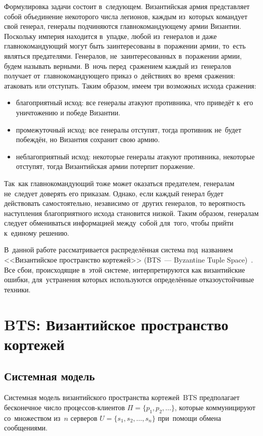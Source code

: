Формулировка задачи состоит в~следующем. Византийская армия представляет собой объединение некоторого числа легионов, каждым из~которых командует свой генерал, генералы подчиняются главнокомандующему армии Византии. Поскольку империя находится в~упадке, любой из~генералов и даже главнокомандующий могут быть заинтересованы в~поражении армии, то~есть являться предателями. Генералов, не~заинтересованных в~поражении армии, будем называть верными. В~ночь перед~сражением каждый из~генералов получает от~главнокомандующего приказ о~действиях во~время сражения: атаковать или отступать. Таким образом, имеем три возможных исхода сражения:
\begin{itemize}
	\item благоприятный исход: все генералы атакуют противника, что приведёт к~его уничтожению и победе Византии.
	\item промежуточный исход: все генералы отступят, тогда противник не~будет побеждён, но Византия сохранит свою армию.
	\item неблагоприятный исход: некоторые генералы атакуют противника, некоторые отступят, тогда Византийская армии потерпит поражение.
\end{itemize}

Так~как главнокомандующий тоже может оказаться предателем, генералам не~следует доверять его приказам. Однако, если каждый генерал будет действовать самостоятельно, независимо от~других генералов, то вероятность наступления благоприятного исхода становится низкой. Таким образом, генералам следует обмениваться информацией между~собой для~того, чтобы прийти к~единому решению.

В~данной работе рассматривается распределённая система под~названием <<Византийское пространство кортежей>> (BTS~--- Byzantine Tuple Space)~\autocite{bts}. Все сбои, происходящие в~этой системе, интерпретируются как византийские ошибки, для~устранения которых используются определённые отказоустойчивые техники. 


\section{BTS: Византийское пространство кортежей}\label{sec:2}
\subsection{Системная модель}\label{subsec:1}
Системная модель византийского пространства кортежей~BTS предполагает бесконечное число процессов-клиентов $\Pi = \{p_1, p_2, \dots\}$, которые коммуницируют со~множеством из~$n$ серверов $U = \{s_1, s_2, \dots, s_n\}$ при~помощи обмена сообщениями.

